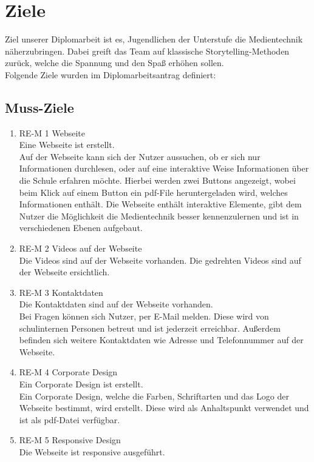 \chapter{Ziele}
\renewcommand{\kapitelautor}{Autor: Hatice Akyokus}
Ziel unserer Diplomarbeit ist es, Jugendlichen der Unterstufe die Medientechnik näherzubringen. Dabei greift das Team auf klassische Storytelling-Methoden zurück, welche die Spannung und den Spaß erhöhen sollen.\\ Folgende Ziele wurden im Diplomarbeitsantrag definiert:

\section{Muss-Ziele}
\begin{enumerate}
\item RE-M 1 Webseite\\
Eine Webseite ist erstellt.\\
Auf der Webseite kann sich der Nutzer aussuchen, ob er sich nur Informationen durchlesen, oder auf eine interaktive Weise Informationen über die Schule erfahren möchte. Hierbei werden zwei Buttons angezeigt, wobei beim Klick auf einem Button ein pdf-File heruntergeladen wird, welches Informationen enthält. Die Webseite enthält interaktive Elemente, gibt dem Nutzer die Möglichkeit die Medientechnik besser kennenzulernen und ist in verschiedenen Ebenen aufgebaut.
\item RE-M 2 Videos auf der Webseite\\
Die Videos sind auf der Webseite vorhanden.
Die gedrehten Videos sind auf der Webseite ersichtlich.
\item RE-M 3 Kontaktdaten\\
Die Kontaktdaten sind auf der Webseite vorhanden.\\
Bei Fragen können sich Nutzer, per E-Mail melden. Diese wird von schulinternen Personen betreut und ist jederzeit erreichbar. Außerdem befinden sich weitere Kontaktdaten wie Adresse und Telefonnummer auf der Webseite.
\item RE-M 4 Corporate Design\\
Ein Corporate Design ist erstellt.\\
Ein Corporate Design, welche die Farben, Schriftarten und das Logo der Webseite bestimmt, wird erstellt. Diese wird als Anhaltspunkt verwendet und ist als pdf-Datei verfügbar.
\item RE-M 5 Responsive Design\\
Die Webseite ist responsive ausgeführt.\\

\end{enumerate}

